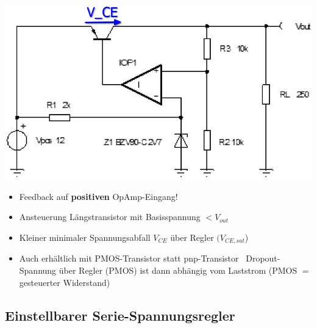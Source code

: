 \begin{minipage}[c]{0.3\columnwidth}
    \includegraphics[width=\columnwidth]{images/ldo_pnp_transistor.png}
\end{minipage}
\hfill
\begin{minipage}[c]{0.68\columnwidth}
    \begin{itemize}
        \item Feedback auf \textbf{positiven} OpAmp-Eingang!
        \item Ansteuerung Längstransistor mit Basisspannung $< V_{out}$
        \item Kleiner minimaler Spannungsabfall $V_{CE}$ über Regler $(V_{CE,sat}$)
        \item Auch erhältlich mit PMOS-Transistor statt pnp-Transistor \textrightarrow\ Dropout-Spannung über Regler (PMOS) ist dann 
            abhängig vom Laststrom (PMOS $=$ gesteuerter Widerstand)
    \end{itemize}
\end{minipage}


\subsection{Einstellbarer Serie-Spannungsregler}

